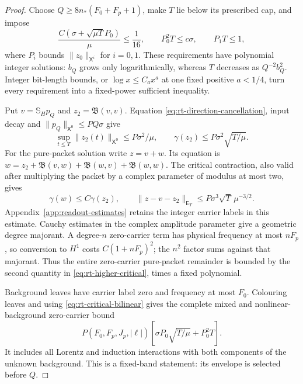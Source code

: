\documentclass[11pt,a4paper]{amsart}
\theoremstyle{definition}
\theoremstyle{remark}
\numberwithin{equation}{section}
\newcommand{\norm}[1]{\lVert #1\rVert}
\begin{document}
\begin{proof}
Choose $Q\ge8n_*(F_0+F_p+1)$, make $T$ lie below its prescribed cap,
and impose
\begin{equation}\label{eq:rt-background-caps}
 \frac{C(\sigma+\sqrt{\mu T}P_0)}\mu\le\frac1{16},
 \qquad P_0^2T\le c\sigma,\qquad P_1T\le1,
\end{equation}
where $P_i$ bounds $\norm{z_0}_{\mathsf X^i}$ for $i=0,1$.
These requirements have polynomial integer solutions: $b_Q$ grows only
logarithmically, whereas $T$ decreases as $Q^{-2}b_Q^2$.
Integer bit-length bounds, or $\log x\le C_a x^a$ at one fixed positive
$a<1/4$, turn every requirement into a fixed-power sufficient inequality.

Put $v=\mathbb S_Hp_Q$ and $z_2=\mathfrak B(v,v)$.  Equation
\eqref{eq:rt-direction-cancellation}, input decay and
$\norm{p_Q}_{\mathsf X^0}\le PQ\sigma$ give
\begin{equation}\label{eq:rt-improved-quadratic}
 \sup_{t\le T}\norm{z_2(t)}_{\mathsf X^0}
       \le P\sigma^2/\mu,
 \qquad \gamma(z_2)\le P\sigma^2\sqrt{T/\mu}.
\end{equation}
For the pure-packet solution write $z=v+w$.  Its equation is
$w=z_2+\mathfrak B(v,w)+\mathfrak B(w,v)+\mathfrak B(w,w)$.
The critical contraction, also valid after multiplying the packet by a
complex parameter of modulus at most two, gives
\begin{equation}\label{eq:rt-higher-critical}
 \gamma(w)\le C\gamma(z_2),\qquad
 \norm{z-v-z_2}_{\mathsf E_T}
      \le P\sigma^3\sqrt T\,\mu^{-3/2}.
\end{equation}
Appendix~\ref{app:readout-estimates} retains the integer carrier labels
in this estimate.  Cauchy estimates in the complex amplitude parameter
give a geometric degree majorant.  A degree-$n$ zero-carrier term has
physical frequency at most $nF_p$, so conversion to $H^1$ costs
$C(1+nF_p)^2$; the $n^2$ factor sums against that majorant.  Thus the
entire zero-carrier pure-packet remainder is bounded by the second
quantity in \eqref{eq:rt-higher-critical}, times a fixed polynomial.

Background leaves have carrier label zero and frequency at most $F_0$.
Colouring leaves and using \eqref{eq:rt-critical-bilinear} gives the
complete mixed and nonlinear-background zero-carrier bound
\begin{equation}\label{eq:rt-mixed-error}
 P(F_0,F_p,J_p,|\ell|)
 \left[\sigma P_0\sqrt{T/\mu}+P_0^2T\right].
\end{equation}
It includes all Lorentz and induction interactions with both components
of the unknown background.  This is a fixed-band statement: its
envelope is selected before $Q$.


\end{proof}
\end{document}
